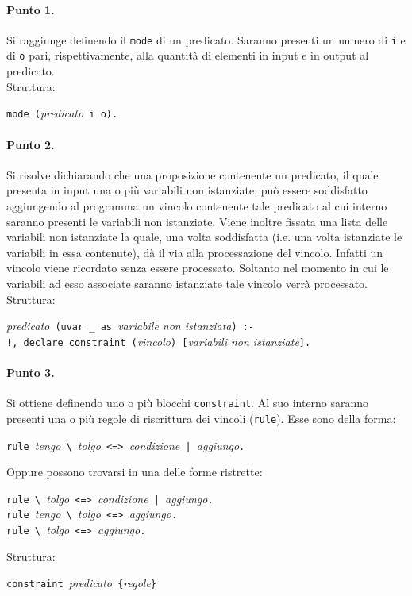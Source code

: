 \documentclass[12pt,a4paper,openright,twoside]{report}
\begin{document}
\paragraph{Punto 1.}
Si raggiunge definendo il \verb"mode" di un predicato. Saranno presenti un numero di \verb"i" e di \verb"o" pari, rispettivamente, alla quantità di elementi in input e in output al predicato.\\
Struttura:
\begin{center}
\verb"mode ("\textit{predicato}\verb" i o)."
\end{center}

\paragraph{Punto 2.}
Si risolve dichiarando che una proposizione contenente un predicato, il quale presenta in input una o più variabili non istanziate, può essere soddisfatto aggiungendo al programma un vincolo contenente tale predicato al cui interno saranno presenti le variabili non istanziate. Viene inoltre fissata una lista delle variabili non istanziate la quale, una volta soddisfatta (i.e. una volta istanziate le variabili in essa contenute), dà il via alla processazione del vincolo. Infatti un vincolo viene ricordato senza essere processato. Soltanto nel momento in cui le variabili ad esso associate saranno istanziate tale vincolo verrà processato.\\
Struttura:
\begin{center}
\textit{predicato}\verb" (uvar _ as "\textit{variabile non istanziata}\verb") :-"\\
\verb"!, declare_constraint ("\textit{vincolo}\verb") ["\textit{variabili non istanziate}\verb"]."
\end{center}

\paragraph{Punto 3.}
Si ottiene definendo uno o più blocchi \verb"constraint". Al suo interno saranno presenti una o più regole di riscrittura dei vincoli (\verb"rule"). Esse sono della forma:
\begin{center}
 \verb"rule "\textit{tengo}\verb" \ "\textit{tolgo}\verb" <=> "\textit{condizione}\verb" | "\textit{aggiungo}\verb"."
\end{center}
Oppure possono trovarsi in una delle forme ristrette:
\begin{center}
 \verb"rule \ "\textit{tolgo}\verb" <=> "\textit{condizione}\verb" | "\textit{aggiungo}\verb"."\\
 \verb"rule "\textit{tengo}\verb" \ "\textit{tolgo}\verb" <=> "\textit{aggiungo}\verb"."\\
 \verb"rule \ "\textit{tolgo}\verb" <=> "\textit{aggiungo}\verb"."\\
\end{center}
Struttura:
\begin{center}
 \verb"constraint "\textit{predicato}\verb" {"\textit{regole}\verb"}"
\end{center}
\end{document}
